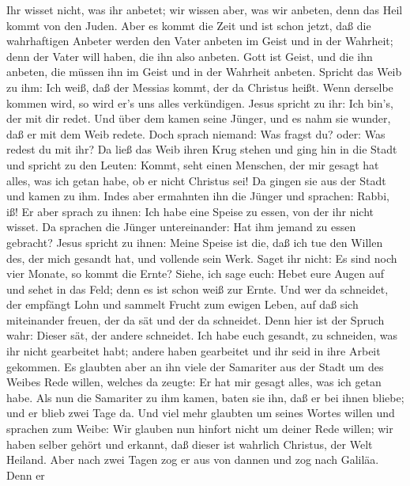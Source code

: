 Ihr wisset nicht, was ihr anbetet; wir wissen aber, was wir anbeten,
denn das Heil kommt von den Juden.  Aber es kommt die Zeit
und ist schon jetzt, daß die wahrhaftigen Anbeter werden den Vater
anbeten im Geist und in der Wahrheit; denn der Vater will haben, die ihn
also anbeten.  Gott ist Geist, und die ihn anbeten, die
müssen ihn im Geist und in der Wahrheit anbeten.  Spricht
das Weib zu ihm: Ich weiß, daß der Messias kommt, der da Christus heißt.
Wenn derselbe kommen wird, so wird er's uns alles verkündigen.
 Jesus spricht zu ihr: Ich bin's, der mit dir redet.
 Und über dem kamen seine Jünger, und es nahm sie wunder,
daß er mit dem Weib redete. Doch sprach niemand: Was fragst du? oder:
Was redest du mit ihr?  Da ließ das Weib ihren Krug stehen
und ging hin in die Stadt und spricht zu den Leuten: 
Kommt, seht einen Menschen, der mir gesagt hat alles, was ich getan
habe, ob er nicht Christus sei!  Da gingen sie aus der
Stadt und kamen zu ihm.  Indes aber ermahnten ihn die
Jünger und sprachen: Rabbi, iß!  Er aber sprach zu ihnen:
Ich habe eine Speise zu essen, von der ihr nicht wisset. 
Da sprachen die Jünger untereinander: Hat ihm jemand zu essen gebracht?
 Jesus spricht zu ihnen: Meine Speise ist die, daß ich tue
den Willen des, der mich gesandt hat, und vollende sein Werk.
 Saget ihr nicht: Es sind noch vier Monate, so kommt die
Ernte? Siehe, ich sage euch: Hebet eure Augen auf und sehet in das Feld;
denn es ist schon weiß zur Ernte.  Und wer da schneidet,
der empfängt Lohn und sammelt Frucht zum ewigen Leben, auf daß sich
miteinander freuen, der da sät und der da schneidet.  Denn
hier ist der Spruch wahr: Dieser sät, der andere schneidet.
 Ich habe euch gesandt, zu schneiden, was ihr nicht
gearbeitet habt; andere haben gearbeitet und ihr seid in ihre Arbeit
gekommen.  Es glaubten aber an ihn viele der Samariter aus
der Stadt um des Weibes Rede willen, welches da zeugte: Er hat mir
gesagt alles, was ich getan habe.  Als nun die Samariter zu
ihm kamen, baten sie ihn, daß er bei ihnen bliebe; und er blieb zwei
Tage da.  Und viel mehr glaubten um seines Wortes willen
 und sprachen zum Weibe: Wir glauben nun hinfort nicht um
deiner Rede willen; wir haben selber gehört und erkannt, daß dieser ist
wahrlich Christus, der Welt Heiland.  Aber nach zwei Tagen
zog er aus von dannen und zog nach Galiläa.  Denn er

